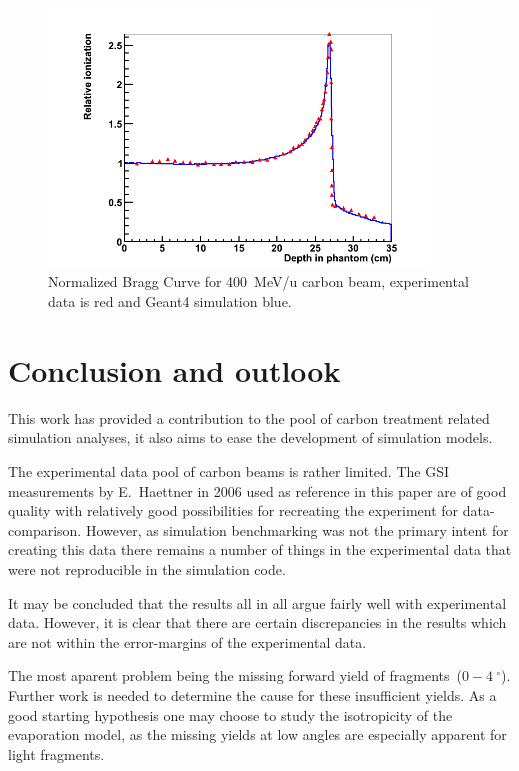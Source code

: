 \begin{figure}[h] 
\begin{center}
\includegraphics[width=0.9\textwidth]{images/plots/braggPeak/braggPeakComparisonToData.png}  
\caption{\label{fig:braggPeakCompared} Normalized Bragg Curve for 400~MeV/u carbon beam, experimental data is red and Geant4 simulation blue.}
 \end{center}
 \end{figure}

\clearpage
\section{Conclusion and outlook}
This work has provided a contribution to the pool of carbon treatment related simulation analyses, it also aims to ease the development of simulation models.

The experimental data pool of carbon beams is rather limited. The GSI measurements by E.~Haettner in 2006 used as reference in this paper are of good quality with relatively good possibilities for recreating the experiment for data-comparison. However, as simulation benchmarking was not the primary intent for creating this data there remains a number of things in the experimental data that were not reproducible in the simulation code.

It may be concluded that the results all in all argue fairly well with experimental data. However, it is clear that there are certain discrepancies in the results which are not within the error-margins of the experimental data.

The most aparent problem being the missing forward yield of fragments~($0-4~^\circ$). Further work is needed to determine the cause for these insufficient yields. As a good starting hypothesis one may choose to study the isotropicity of the evaporation model, as the missing yields at low angles are especially apparent for light fragments.

